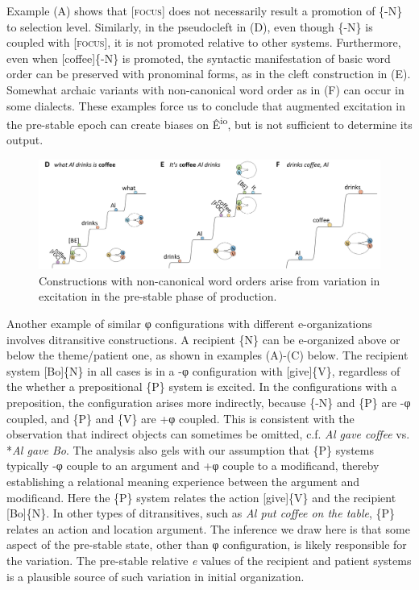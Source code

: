   Example (A) shows that [\textsc{focus}] does not necessarily result a promotion of \{-N\} to selection level. Similarly, in the pseudocleft in (D), even though \{-N\} is coupled with [\textsc{focus}], it is not promoted relative to other systems. Furthermore, even when [coffee]\{-N\} is promoted, the syntactic manifestation of basic word order can be preserved with pronominal forms, as in the cleft construction in (E). Somewhat archaic variants with non-canonical word order as in (F) can occur in some dialects. These examples force us to conclude that augmented excitation in the pre-stable epoch can create biases on Ê\textsuperscript{io}, but is not sufficient to determine its output. 

  
\begin{figure}
\includegraphics[width=\textwidth]{figures/Tilsen-img79.png}
\caption{Constructions with non-canonical word orders arise from variation in excitation in the pre-stable phase of production.}
\label{fig:4:29}
\end{figure}
 

  Another example of similar φ configurations with different e-organizations involves ditransitive constructions. A recipient \{N\} can be e-organized above or below the theme/patient one, as shown in examples (A)-(C) below. The recipient system [Bo]\{N\} in all cases is in a -φ configuration with [give]\{V\}, regardless of the whether a prepositional \{P\} system is excited. In the configurations with a preposition, the configuration arises more indirectly, because \{-N\} and \{P\} are -φ coupled, and \{P\} and \{V\} are +φ coupled. This is consistent with the observation that indirect objects can sometimes be omitted, c.f. \textit{Al gave coffee} vs. *\textit{Al gave Bo}. The analysis also gels with our assumption that \{P\} systems typically -φ couple to an argument and +φ couple to a modificand, thereby establishing a relational meaning experience between the argument and modificand. Here the \{P\} system relates the action [give]\{V\} and the recipient [Bo]\{N\}. In other types of ditransitives, such as \textit{Al put coffee on the table}, \{P\} relates an action and location argument. The inference we draw here is that some aspect of the pre-stable state, other than φ configuration, is likely responsible for the variation. The pre-stable relative \textit{e} values of the recipient and patient systems is a plausible source of such variation in initial organization.

